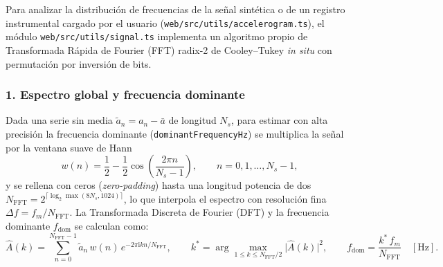 \documentclass[11pt,a4paper]{article}
\newcommand{\src}[1]{\nolinkurl{#1}}
\newcommand{\unit}[1]{\mathrm{#1}}
\begin{document}
Para analizar la distribución de frecuencias de la señal sintética o de un registro instrumental cargado por el
usuario (\src{web/src/utils/accelerogram.ts}), el módulo \src{web/src/utils/signal.ts} implementa un algoritmo
propio de Transformada Rápida de Fourier (FFT) radix-2 de Cooley--Tukey \emph{in situ} con permutación por
inversión de bits.

\subsubsection*{1. Espectro global y frecuencia dominante}
Dada una serie sin media $\tilde a_n = a_n - \bar a$ de longitud $N_s$, para estimar con alta precisión la
frecuencia dominante (\texttt{dominantFrequencyHz}) se multiplica la señal por la ventana suave de Hann
\begin{equation}
  w(n) = \frac{1}{2} - \frac{1}{2}\cos\!\left(\frac{2\pi n}{N_s - 1}\right),
  \qquad n = 0,1,\ldots,N_s - 1,
  \label{eq:ventana-hann}
\end{equation}
y se rellena con ceros (\emph{zero-padding}) hasta una longitud potencia de dos
$N_{\mathrm{FFT}} = 2^{\lceil\log_2\max(8N_s, 1024)\rceil}$, lo que interpola el espectro con resolución fina
$\Delta f = f_m / N_{\mathrm{FFT}}$. La Transformada Discreta de Fourier (DFT) y la frecuencia dominante
$f_{\mathrm{dom}}$ se calculan como:
\begin{equation}
  \widehat A(k) = \sum_{n=0}^{N_{\mathrm{FFT}}-1} \tilde a_n\,w(n)\,e^{-2\pi\mathrm{i}kn/N_{\mathrm{FFT}}},
  \qquad
  k^\ast = \arg\max_{1\le k \le N_{\mathrm{FFT}}/2} \bigl|\widehat A(k)\bigr|^2,
  \qquad
  f_{\mathrm{dom}} = \frac{k^\ast\,f_m}{N_{\mathrm{FFT}}}\quad[\unit{Hz}].
  \label{eq:fft-dominante}
\end{equation}
\end{document}
